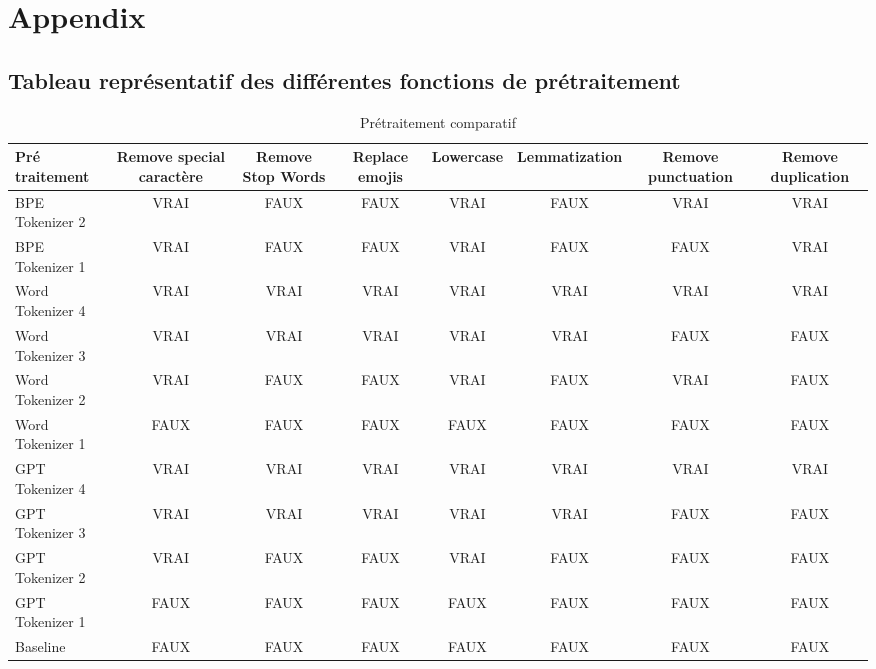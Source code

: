 \chapter{Appendix}
\label{chap:appendix_tokenizer}

\section*{Tableau représentatif des différentes fonctions de prétraitement}
\begin{table}[ht]
    \centering
    \begin{adjustbox}{max width=\textwidth}
    \renewcommand{\arraystretch}{1.5} %
    \setlength{\tabcolsep}{6pt} %
    \begin{tabular}{|p{3.5cm}|c|c|c|c|c|c|c|}
        \hline
        \textbf{Pré traitement} & \textbf{Remove special caractère} & \textbf{Remove Stop Words} & \textbf{Replace emojis} & \textbf{Lowercase} & \textbf{Lemmatization} & \textbf{Remove punctuation} & \textbf{Remove duplication} \\
        \hline
        BPE Tokenizer 2  & VRAI & FAUX & FAUX & VRAI & FAUX & VRAI & VRAI \\
        BPE Tokenizer 1  & VRAI & FAUX & FAUX & VRAI & FAUX & FAUX & VRAI \\
        Word Tokenizer 4  & VRAI & VRAI & VRAI & VRAI & VRAI & VRAI & VRAI \\
        Word Tokenizer 3 & VRAI & VRAI & VRAI & VRAI & VRAI & FAUX & FAUX \\
        Word Tokenizer 2  & VRAI & FAUX & FAUX & VRAI & FAUX & VRAI & FAUX \\
        Word Tokenizer 1  & FAUX & FAUX & FAUX & FAUX & FAUX & FAUX & FAUX \\
        GPT Tokenizer 4  & VRAI & VRAI & VRAI & VRAI & VRAI & VRAI & VRAI \\
        GPT Tokenizer 3 & VRAI & VRAI & VRAI & VRAI & VRAI & FAUX & FAUX \\
        GPT Tokenizer 2  & VRAI & FAUX & FAUX & VRAI & FAUX & FAUX & FAUX \\
        GPT Tokenizer 1 & FAUX & FAUX & FAUX & FAUX & FAUX & FAUX & FAUX \\
        Baseline & FAUX & FAUX & FAUX & FAUX & FAUX & FAUX & FAUX \\
        \hline
    \end{tabular}
    \end{adjustbox}
    \caption{Prétraitement comparatif}
    \label{tab:pre_treatment_comparative}
\end{table}